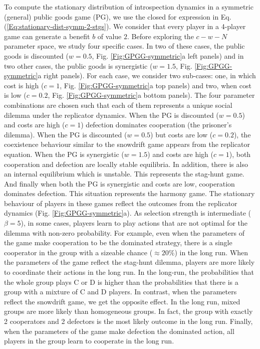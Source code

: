 \documentclass[11pt]{article}
\theoremstyle{plainCl1}
\theoremstyle{plainCl2}
\newcommand{\C}{\mathrm{C}}
\newcommand{\D}{\mathrm{D}}
\begin{document}
\noindent To compute the stationary distribution of introspection dynamics in a symmetric (general) public goods game (PG), we use the closed for expression in Eq. (\ref{Eq:stationary-dist-symm-2-stgs}). We consider that every player in a 4-player game can generate a benefit $b$ of value $2$. Before exploring the $c-w-N$ parameter space, we study four specific cases.  In two of these cases, the public goods is discounted ($w = 0.5$, Fig. \ref{Fig:GPGG-symmetric}a left panels) and in two other cases, the public goods is synergistic ($w = 1.5$, Fig. \ref{Fig:GPGG-symmetric}a right panels). For each case, we consider two sub-cases: one, in which cost is high ($c = 1$,  Fig. \ref{Fig:GPGG-symmetric}a top panels) and two, when cost is low ($c = 0.2$, Fig. \ref{Fig:GPGG-symmetric}a bottom panels). The four parameter combinations are chosen such that each of them represents a unique social dilemma under the replicator dynamics.  When the PG is discounted ($w = 0.5$) and costs are high ($c = 1$) defection dominates cooperation (the prisoner's dilemma). When the PG is discounted ($w = 0.5$) but costs are low ($c = 0.2$), the coexistence behaviour similar to the snowdrift game appears from the replicator equation. When the PG is synergistic ($w = 1.5$) and costs are high ($c = 1$), both cooperation and defection are locally stable equilibria. In addition, there is also an internal equilibrium which is unstable. This represents the stag-hunt game. And finally when both the PG is synergistic and costs are low, cooperation dominates defection. This situation represents the harmony game. The stationary behaviour of players in these games reflect the outcomes from the replicator dynamics (Fig. \ref{Fig:GPGG-symmetric}a). As selection strength is intermediate ($\beta = 5$), in some cases, players learn to play actions that are not optimal for the dilemma with non-zero probability. For example, even when the parameters of the game make cooperation to be the dominated strategy, there is a single cooperator in the group with a sizeable chance ($\approx 20\%$) in the long run. When the parameters of the game reflect the stag-hunt dilemma, players are more likely to coordinate their actions in the long run. In the long-run, the probabilities that the whole group plays $\C$ or $\D$ is higher than the probabilities that there is a group with a mixture of $\C$ and $\D$ players. In contrast, when the parameters reflect the snowdrift game, we get the opposite effect. In the long run, mixed groups are more likely than homogeneous groups. In fact, the group with exactly 2 cooperators and 2 defectors is the most likely outcome in the long run. Finally, when the parameters of the game make defection the dominated action, all players in the group learn to cooperate in the long run. \\ \\ 
\end{document}

